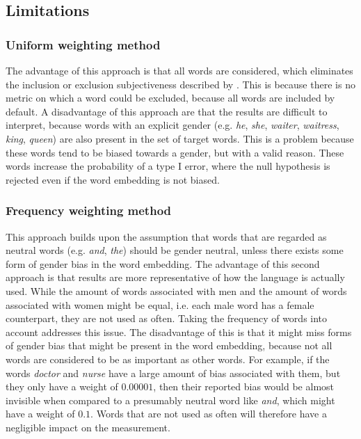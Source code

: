 \subsection{Limitations}

\subsubsection{Uniform weighting method} \label{section:discussion_uniform_method}
The advantage of this approach is
that all words are considered, which eliminates the inclusion or exclusion subjectiveness
described by \textcite{nissim_fair_is_better_2020}.  This is because there is no metric
on which a word could be excluded, because all words are included by default.
A disadvantage of this approach
are that the results are difficult to interpret, because words with an explicit
gender (e.g. \textit{he}, \textit{she}, \textit{waiter}, \textit{waitress},
\textit{king}, \textit{queen}) are also
present in the set of target words. This is a problem because these words tend to be biased
towards a gender, but with a valid reason. These words increase the probability of a
type I error, where the null hypothesis is rejected even if the word embedding is not
biased.

\subsubsection{Frequency weighting method} \label{section:discussion_frequency_method}
This approach builds upon the assumption that words that are regarded as neutral words
(e.g. \textit{and}, \textit{the}) should be gender neutral, unless there exists some form
of gender bias in the word embedding.
The advantage of this second approach is that results are more representative of how
the language is actually used. While the amount of words associated with men and the
amount of words associated with women might be equal, i.e. each male word has a female
counterpart, they are not used as often.
Taking the frequency of words into account addresses this issue. 
The disadvantage of this is that
it might miss forms of gender bias that might be present in the word embedding, because
not all words are considered to be as important as other words. For example, if the words
\textit{doctor} and \textit{nurse} have a large amount of bias associated with them,
but they only have a weight of $0.00001$, then their reported bias would be almost
invisible when compared to a presumably neutral word like \textit{and}, which might have
a weight of $0.1$. Words that are not used as often will therefore have a negligible impact
on the measurement.






